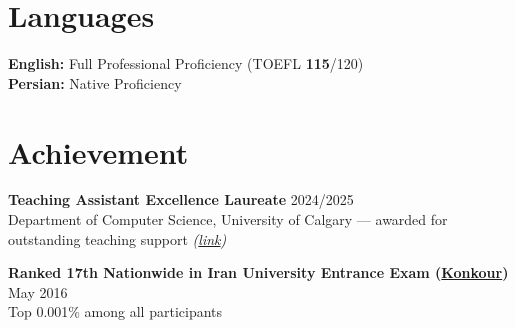\documentclass[a4paper,10pt]{article}
\begin{document}

\section*{Languages}

\textbf{English:} Full Professional Proficiency (TOEFL \textbf{115}/120) \\
\textbf{Persian:} Native Proficiency

\section*{Achievement}

\textbf{Teaching Assistant Excellence Laureate} \hfill 2024/2025 \\
Department of Computer Science, University of Calgary --- awarded for outstanding teaching support \textit{(\href{https://science.ucalgary.ca/computer-science/about/our-department/ta-recognition-2024-2025}{link})}

\vspace{0.35em}

\textbf{Ranked 17th Nationwide in Iran University Entrance Exam (\href{https://en.wikipedia.org/wiki/Iranian_University_Entrance_Exam}{Konkour})} \hfill May 2016 \\
Top 0.001\% among all participants
\end{document}

